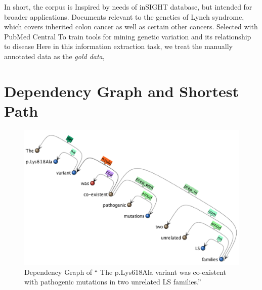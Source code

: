 In short, the corpus is Inspired by needs of inSIGHT database, but intended for broader applications. Documents relevant to the genetics of Lynch syndrome, which covers inherited colon cancer as well as certain other cancers. Selected with PubMed Central To train tools for mining genetic variation and its relationship to disease
Here in this information extraction task, we treat the manually annotated data as the \emph{gold data}, 
\section{Dependency Graph and Shortest Path}
	\begin{figure}
		\centering
			\includegraphics[width=\textwidth]{Dependency_Graph}
			\caption{Dependency Graph of `` The p.Lys618Ala variant was co-existent with pathogenic mutations in two unrelated LS families.''}
			\label{fig:Dependency_Graph}   
	\end{figure}

